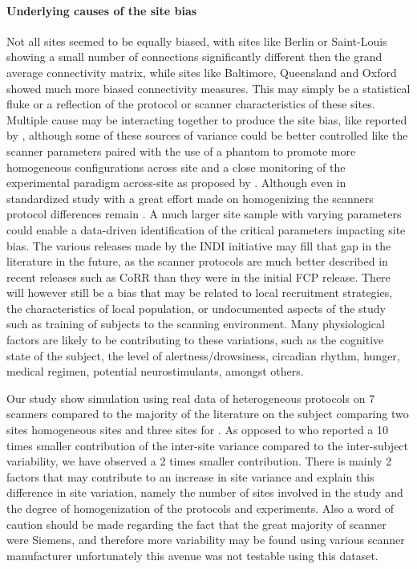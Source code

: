 \documentclass[authoryear]{elsarticle}
\begin{document}
\paragraph{Underlying causes of the site bias}
Not all sites seemed to be equally biased, with sites like Berlin or Saint-Louis showing a small number of connections significantly different then the grand average connectivity matrix, while sites like Baltimore, Queensland and Oxford showed much more biased connectivity measures. This may simply be a statistical fluke or a reflection of the protocol or scanner characteristics of these sites. Multiple cause may be interacting together to produce the site bias, like reported by \cite{Yan2013a}, although some of these sources of variance could be better controlled like the scanner parameters paired with the use of a phantom to promote more homogeneous configurations across site and a close monitoring of the experimental paradigm across-site as proposed by \cite{Friedman2006,Friedman2006a,Glover2012}. Although even in standardized study with a great effort made on homogenizing the scanners protocol differences remain \cite{Brown2011}. A much larger site sample with varying parameters could enable a data-driven identification of the critical parameters impacting site bias. The various releases made by the INDI initiative may fill that gap in the literature in the future, as the scanner protocols are much better described in recent releases such as CoRR than they were in the initial FCP release. There will however still be a bias that may be related to local recruitment strategies, the characteristics of local population, or undocumented aspects of the study such as training of subjects to the scanning environment. Many physiological factors are likely to be contributing to these variations, such as the cognitive state of the subject, the level of alertness/drowsiness, circadian rhythm, hunger, medical regimen, potential neurostimulants, amongst others. 

Our study show simulation using real data of heterogeneous protocols on 7 scanners compared to the majority of the literature on the subject comparing two sites homogeneous sites \citep{Costafreda2007,Suckling2008,Sutton2008,Glover2012} and three sites for \cite{Gountouna2010}. As opposed to \cite{Sutton2008,Brown2011} who reported a 10 times smaller contribution of the inter-site variance compared to the inter-subject variability, we have observed a 2 times smaller contribution. There is mainly 2 factors that may contribute to an increase in site variance and explain this difference in site variation, namely the number of sites involved in the study and the degree of homogenization of the protocols and experiments. Also a word of caution should be made regarding the fact that the great majority of scanner were Siemens, and therefore more variability may be found using various scanner manufacturer unfortunately this avenue was not testable using this dataset.
\end{document}
